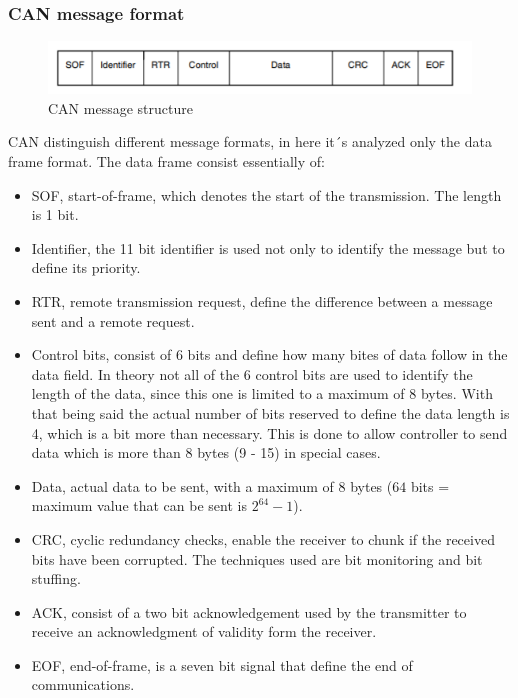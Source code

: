 \documentclass[../main.tex]{subfiles}
\begin{document}
\subsubsection{CAN message format}
\begin{figure}[h]
    \centering
    \includegraphics[width=\linewidth]{images_folder/can message.png}
    \caption{CAN message structure}
    \label{fig:CANMSG}
\end{figure}
CAN distinguish different message formats, in here it´s analyzed only the data frame format. The data frame consist essentially of:
\begin{itemize}
    \item SOF, start-of-frame, which denotes the start of the transmission. The length is 1 bit. 
    \item Identifier, the 11 bit identifier is used not only to identify the message but to define its priority. 
    \item RTR, remote transmission request, define the difference between a message sent and a remote request. 
    \item Control bits, consist of 6 bits and define how many bites of data follow in the data field. In theory not all of the 6 control bits are used to identify the length of the data, since this one is limited to a maximum of 8 bytes. With that being said the actual number of bits reserved to define the data length is 4, which is a bit more than necessary. This is done to allow controller to send data which is more than 8 bytes (9 - 15) in special cases.
    \item Data, actual data to be sent, with a maximum of 8 bytes ($64$ bits = maximum value that can be sent is $2^64 - 1$).
    \item CRC, cyclic redundancy checks, enable the receiver to chunk if the received bits have been corrupted. The techniques used are bit monitoring and bit stuffing.
    \item ACK, consist of a two bit acknowledgement used by the transmitter to receive an acknowledgment of validity form the receiver.
    \item EOF, end-of-frame, is a seven bit signal that define the end of communications. 
\end{itemize}
\end{document}
